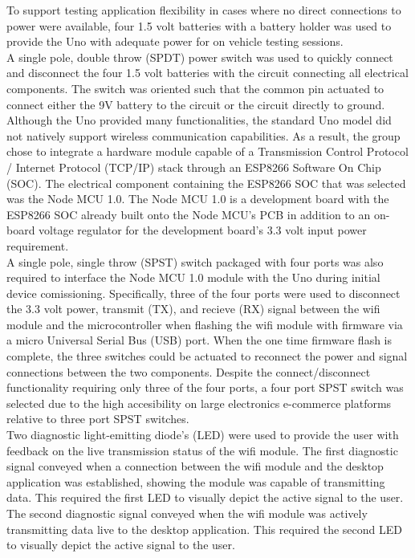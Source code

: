 \documentclass[12pt, titlepage]{article}
\begin{document}
To support testing application flexibility in cases where no direct connections to power were available, four 1.5 volt batteries with a battery holder was used to provide the Uno with adequate power for on vehicle testing sessions. \\

A single pole, double throw (SPDT) power switch was used to quickly connect and disconnect the four 1.5 volt batteries with the circuit connecting all electrical components. The switch was oriented such that the common pin actuated to connect either the 9V battery to the circuit or the circuit directly to ground. \\

Although the Uno provided many functionalities, the standard Uno model did not natively support wireless communication capabilities. As a result, the group chose to integrate a hardware module capable of a Transmission Control Protocol / Internet Protocol (TCP/IP) stack through an ESP8266 Software On Chip (SOC). The electrical component containing the ESP8266 SOC that was selected was the Node MCU 1.0. The Node MCU 1.0 is a development board with the ESP8266 SOC already built onto the Node MCU's PCB in addition to an on-board voltage regulator for the development board's 3.3 volt input power requirement. \\

A single pole, single throw (SPST) switch packaged with four ports was also required to interface the Node MCU 1.0 module with the Uno during initial device comissioning. Specifically, three of the four ports were used to disconnect the 3.3 volt power, transmit (TX), and recieve (RX) signal between the wifi module and the microcontroller when flashing the wifi module with firmware via a micro Universal Serial Bus (USB) port. When the one time firmware flash is complete, the three switches could be actuated to reconnect the power and signal connections between the two components. Despite the connect/disconnect functionality requiring only three of the four ports, a four port SPST switch was selected due to the high accesibility on large electronics e-commerce platforms relative to three port SPST switches. \\

Two diagnostic light-emitting diode's (LED) were used to provide the user with feedback on the live transmission status of the wifi module. The first diagnostic signal conveyed when a connection between the wifi module and the desktop application was established, showing the module was capable of transmitting data. This required the first LED to visually depict the active signal to the user. The second diagnostic signal conveyed when the wifi module was actively transmitting data live to the desktop application. This required the second LED to visually depict the active signal to the user. \\
\end{document}
